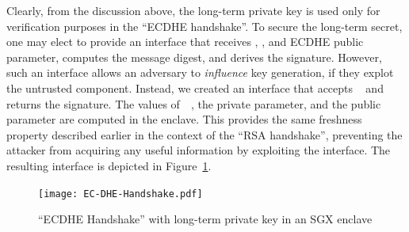 \documentclass[../../main.tex]{subfiles}
\begin{document}
Clearly, from the discussion above, the long-term private key is used
only for verification purposes in the ``ECDHE handshake''. To secure
the long-term secret, one may elect to provide an interface that
receives \crandom, \srandom, and ECDHE public parameter, computes the
message digest, and derives the signature. However, such an interface
allows an adversary to \textit{influence} key generation, if they
explot the untrusted component. Instead, we created an interface that
accepts \crandom~ and returns the signature. The values of~\srandom~,
the private parameter, and the public parameter are computed in the
enclave. This provides the same freshness property described earlier
in the context of the ``RSA handshake'', preventing the attacker from
acquiring any useful information by exploiting the interface. The
resulting interface is depicted in Figure~\ref{fig:ecdhe-handshake}.

\begin{figure}[H]
  \centering
  \texttt{[image: EC-DHE-Handshake.pdf]}
  \caption{``ECDHE Handshake'' with long-term private key in an SGX
    enclave}
  \label{fig:ecdhe-handshake}
\end{figure}
\end{document}
